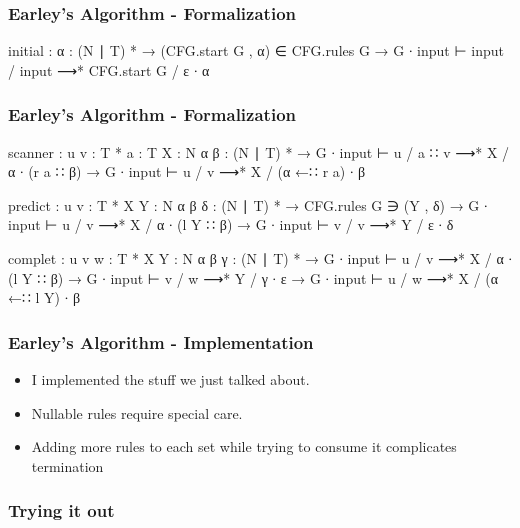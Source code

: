 \begin{frame}
	\frametitle{Earley's Algorithm - Formalization}
	\begin{code}
	  initial : {α : (N ∣ T) *} →
	    (CFG.start G , α) ∈ CFG.rules G →
	    G ∙ input ⊢ input / input ⟶* CFG.start G / ε ∙ α
	\end{code}
\end{frame}

\begin{frame}
	\frametitle{Earley's Algorithm - Formalization}
	\begin{code}
	  scanner : {u v : T *} {a : T} {X : N} {α β : (N ∣ T) *} →
	    G ∙ input ⊢ u / a ∷ v ⟶* X / α ∙ (r a ∷ β) →
	    G ∙ input ⊢ u / v ⟶* X / (α ←∷ r a) ∙ β

	  predict : {u v : T *} {X Y : N} {α β δ : (N ∣ T) *} →
	    CFG.rules G ∋ (Y , δ) →
	    G ∙ input ⊢ u / v ⟶* X / α ∙ (l Y ∷ β) →
	    G ∙ input ⊢ v / v ⟶* Y / ε ∙ δ

	  complet : {u v w : T *} {X Y : N} {α β γ : (N ∣ T) *} →
	    G ∙ input ⊢ u / v ⟶* X / α ∙ (l Y ∷ β) →
	    G ∙ input ⊢ v / w ⟶* Y / γ ∙ ε →
	    G ∙ input ⊢ u / w ⟶* X / (α ←∷ l Y) ∙ β
	\end{code}
\end{frame}

\begin{frame}
	\frametitle{Earley's Algorithm - Implementation}
	\begin{itemize}
		\item I implemented the stuff we just talked about.
		\item Nullable rules require special care.
		\item Adding more rules to each set while trying to consume it
			complicates termination
	\end{itemize}
\end{frame}

\begin{frame}
	\frametitle{Trying it out}
\end{frame}


